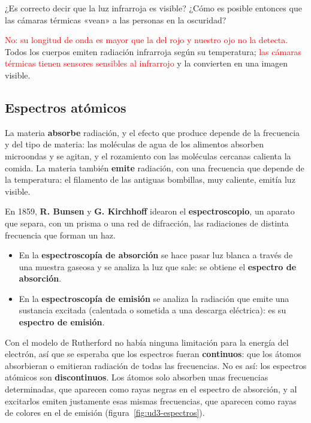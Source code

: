 \begin{exercise}
    ¿Es correcto decir que la luz infrarroja es visible? ¿Cómo es posible entonces que las cámaras térmicas «vean» a las personas
    en la oscuridad?
    \begin{solu}
        \textcolor{red}{No: su longitud de onda es mayor que la del rojo y nuestro ojo no la detecta.} Todos los cuerpos emiten
        radiación infrarroja según su temperatura; \textcolor{red}{las cámaras térmicas tienen sensores sensibles al infrarrojo} y
        la convierten en una imagen visible.
    \end{solu}
\end{exercise}

\subsection{Espectros atómicos}

La materia \textbf{absorbe} radiación, y el efecto que produce depende de la frecuencia y del tipo de materia: las moléculas de
agua de los alimentos absorben microondas y se agitan, y el rozamiento con las moléculas cercanas calienta la comida. La materia
también \textbf{emite} radiación, con una frecuencia que depende de la temperatura: el filamento de las antiguas bombillas,
muy caliente, emitía luz visible.

En 1859, \textbf{R. Bunsen} y \textbf{G. Kirchhoff} idearon el \textbf{espectroscopio}, un aparato que separa, con un prisma o
una red de difracción, las radiaciones de distinta frecuencia que forman un haz.
\begin{itemize}
    \item En la \textbf{espectroscopía de absorción} se hace pasar luz blanca a través de una muestra gaseosa y se analiza la luz
    que sale: se obtiene el \textbf{espectro de absorción}.
    \item En la \textbf{espectroscopía de emisión} se analiza la radiación que emite una sustancia excitada (calentada o sometida a
    una descarga eléctrica): es su \textbf{espectro de emisión}.
\end{itemize}

Con el modelo de Rutherford no había ninguna limitación para la energía del electrón, así que se esperaba que los espectros
fueran \textbf{continuos}: que los átomos absorbieran o emitieran radiación de todas las frecuencias. No es así: los espectros
atómicos son \textbf{discontinuos}. Los átomos solo absorben unas frecuencias determinadas, que aparecen como rayas negras en el
espectro de absorción, y al excitarlos emiten justamente esas mismas frecuencias, que aparecen como rayas de colores en el de
emisión (figura~\ref{fig:ud3-espectros}).

